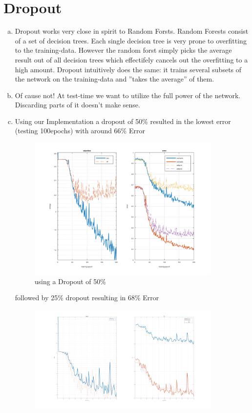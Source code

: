 \documentclass[12pt]{article}
\begin{document}
\section{Dropout}

\begin{enumerate}[a)]
    \item 
        Dropout works very close in spirit to Random Forsts. Random Forests consist of a set of decision trees. Each single decision tree is very prone to overfitting to the training-data. However the random forst simply picks the average result out of all decision trees which effectifely cancels out the overfitting to a high amount. Dropout intuitively does the same: it trains several subsets of the network on the training-data and ''takes the average'' of them. 
    \item
        Of cause not! At test-time we want to utilize the full power of the network. Discarding parts of it doesn't make sense.
    \item
        Using our Implementation a dropout of 50\% resulted in the lowest error (testing 100epochs) with around 66\% Error 
        \begin{figure}[H]
            \centering
                \includegraphics[width=0.9\textwidth]{Plots/3_50_200.png}
                \caption{using a Dropout of 50\%}
        \end{figure}
        followed by 25\% dropout resulting in 68\% Error 
        \begin{figure}[H]
            \centering
                \includegraphics[width=0.9\textwidth]{Plots/3_75_100.png}

\end{figure}
\end{enumerate}
\end{document}
